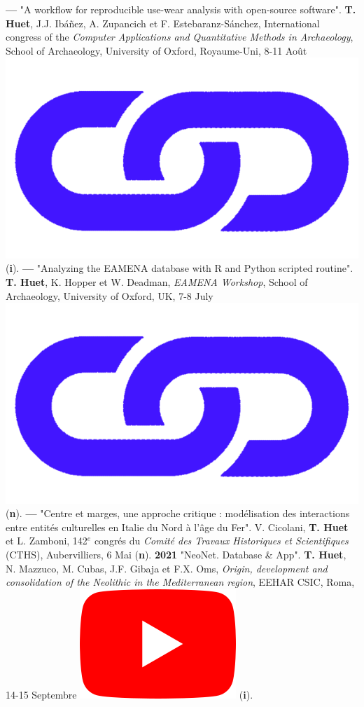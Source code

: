 \documentclass{article}
\begin{document}
\textbf{--- }"A workflow for reproducible use-wear analysis with open-source software". \textbf{T. Huet}, J.J. Ibáñez, A. Zupancich et F. Estebaranz-Sánchez, International congress of the \textit{Computer Applications and Quantitative Methods in Archaeology}, School of Archaeology, University of Oxford, Royaume-Uni, 8-11 Août \href{https://zoometh.github.io/reveal.js/projects/caa_3dlithic}{\includegraphics[scale=0.015]{link_darkblue.png}} (\textbf{i}).
\smallbreak
\textbf{--- }"Analyzing the EAMENA database with R and Python scripted routine". \textbf{T. Huet}, K. Hopper et W. Deadman, \textit{EAMENA Workshop}, School of Archaeology, University of Oxford, UK, 7-8 July \href{https://eamena-project.github.io/reveal.js/projects/time.html}{\includegraphics[scale=0.015]{link_darkblue.png}} (\textbf{n}).
\textbf{--- }"Centre et marges, une approche critique : modélisation des interactions entre entités culturelles en Italie du Nord à l'âge du Fer". V. Cicolani, \textbf{T. Huet} et L. Zamboni, 142${}^{e}$ congr\'{e}s du \textit{Comit\'{e} des Travaux Historiques et Scientifiques} (CTHS), Aubervilliers, 6 Mai (\textbf{n}).
\smallbreak
\textbf{2021 }"NeoNet. Database \& App". \textbf{T. Huet}, N. Mazzuco, M. Cubas, J.F. Gibaja et F.X. Oms, \textit{Origin, development and consolidation of the Neolithic in the Mediterranean region}, EEHAR CSIC, Roma, 14-15 Septembre \href{https://youtu.be/GM2niot0XwE?t=10700}{\includegraphics[scale=0.2]{icon_youtube}} (\textbf{i}).
\end{document}
